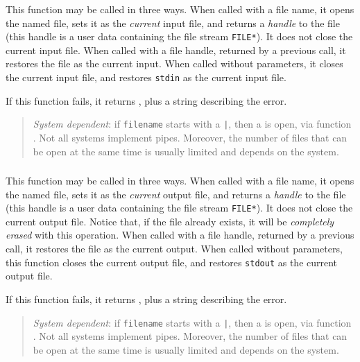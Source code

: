 This function may be called in three ways.
When called with a file name,
it opens the named file,
sets it as the {\em current\/} input file,
and returns a {\em handle\/} to the file
(this handle is a user data containing the file stream \verb|FILE*|).
It does not close the current input file.
When called with a file handle, returned by a previous call,
it restores the file as the current input.
When called without parameters,
it closes the current input file,
and restores \verb'stdin' as the current input file.

If this function fails, it returns \nil,
plus a string describing the error.

\begin{quotation}
\noindent
{\em System dependent\/}: if \verb'filename' starts with a \verb'|',
then a  is open, via function .
Not all systems implement pipes.
Moreover,
the number of files that can be open at the same time is usually limited and
depends on the system.
\end{quotation}

\subsubsection*{}

This function may be called in three ways.
When called with a file name,
it opens the named file,
sets it as the {\em current\/} output file,
and returns a {\em handle\/} to the file
(this handle is a user data containing the file stream \verb|FILE*|).
It does not close the current output file.
Notice that, if the file already exists,
it will be {\em completely erased\/} with this operation.
When called with a file handle, returned by a previous call,
it restores the file as the current output.
When called without parameters,
this function closes the current output file,
and restores \verb'stdout' as the current output file.

If this function fails, it returns \nil,
plus a string describing the error.

\begin{quotation}
\noindent
{\em System dependent\/}: if \verb'filename' starts with a \verb'|',
then a  is open, via function .
Not all systems implement pipes.
Moreover,
the number of files that can be open at the same time is usually limited and
depends on the system.
\end{quotation}

